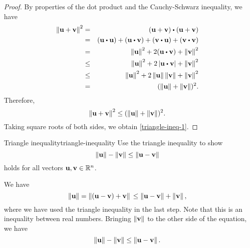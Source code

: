 \begin{proof}
  By properties of the dot product and the Cauchy-Schwarz inequality,
  we have
  \begin{eqnarray*}
    \norm{\vect{u}+\vect{v}}^{2}
    &=& (\vect{u}+\vect{v})\dotprod(\vect{u}+\vect{v}) \\
    & =&(\vect{u}\dotprod\vect{u})+(\vect{u}\dotprod\vect{v})+(\vect{v}\dotprod\vect{u})+(\vect{v}\dotprod\vect{v}) \\
    &=&\norm{\vect{u}}^{2}+2(\vect{u}\dotprod\vect{v})+\norm{\vect{v}}^{2} \\
    &\leq& \norm{\vect{u}}^{2}+2\abs{\vect{u}\dotprod\vect{v}}+\norm{\vect{v}}^{2} \\
    &\leq& \norm{\vect{u}}^{2}+2\norm{\vect{u}}\norm{\vect{v}}+\norm{\vect{v}}^{2} \\
    &=& (\norm{\vect{u}}+\norm{\vect{v}})^{2}.
  \end{eqnarray*}
  Therefore,
  \begin{equation*}
    \norm{\vect{u}+\vect{v}}^{2}\leq(\norm{\vect{u}}+\norm{\vect{v}})^{2}.
  \end{equation*}
  Taking square roots of both sides, we obtain \eqref{triangle-ineq-1}.
\end{proof}

\begin{example}{Triangle inequality}{triangle-inequality}
  Use the triangle inequality to show
  \begin{equation*}
    \norm{\vect{u}} -\norm{\vect{v}} \leq \norm{\vect{u}-\vect{v}}
  \end{equation*}
  holds for all vectors $\vect{u},\vect{v}\in\R^n$.
\end{example}

\begin{solution}
  We have
  \begin{equation*}
    \norm{\vect{u}}
    = \norm{(\vect{u}-\vect{v})+\vect{v}} \\
    \leq \norm{\vect{u}-\vect{v}}+\norm{\vect{v}},
  \end{equation*}
  where we have used the triangle inequality in the last step. Note
  that this is an inequality between real numbers. Bringing
  $\norm{\vect{v}}$ to the other side of the equation, we have
  \begin{equation*}
    \norm{\vect{u}} - \norm{\vect{v}} \leq \norm{\vect{u}-\vect{v}}.
  \end{equation*}
\end{solution}
